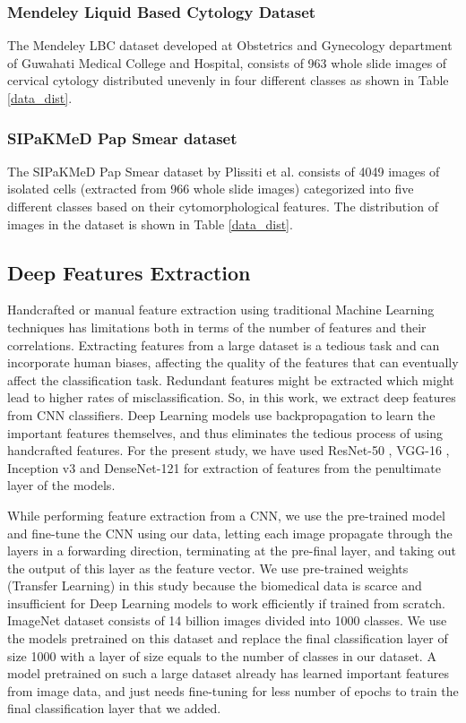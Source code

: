 \documentclass{llncs}
\begin{document}
\subsubsection{Mendeley Liquid Based Cytology Dataset}
The Mendeley LBC dataset \cite{hussain2020liquid} developed at Obstetrics and Gynecology department of Guwahati Medical College and Hospital, consists of 963 whole slide images of cervical cytology distributed unevenly in four different classes as shown in Table \ref{data_dist}.
\subsubsection{SIPaKMeD Pap Smear dataset}
The SIPaKMeD Pap Smear dataset by Plissiti et al. \cite{plissiti2018sipakmed} consists of 4049 images of isolated cells (extracted from 966 whole slide images) categorized into five different classes based on their cytomorphological features. The distribution of images in the dataset is shown in Table \ref{data_dist}.
\subsection{Deep Features Extraction}
Handcrafted or manual feature extraction using traditional Machine Learning techniques has limitations both in terms of the number of features and their correlations. Extracting features from a large dataset is a tedious task and can incorporate human biases, affecting the quality of the features that can eventually affect the classification task. Redundant features might be extracted which might lead to higher rates of misclassification. So, in this work, we extract deep features from CNN classifiers. Deep Learning models use backpropagation to learn the important features themselves, and thus eliminates the tedious process of using handcrafted features. For the present study, we have used ResNet-50 \cite{he2016deep}, VGG-16 \cite{simonyan2014very}, Inception v3 \cite{szegedy2016rethinking} and DenseNet-121 \cite{huang2017densely} for extraction of features from the penultimate layer of the models.

While performing feature extraction from a CNN, we use the pre-trained model and fine-tune the CNN using our data, letting each image propagate through the layers in a forwarding direction, terminating at the pre-final layer, and taking out the output of this layer as the feature vector. We use pre-trained weights (Transfer Learning) in this study because the biomedical data is scarce and insufficient for Deep Learning models to work efficiently if trained from scratch. ImageNet \cite{deng2009imagenet} dataset consists of 14 billion images divided into 1000 classes. We use the models pretrained on this dataset and replace the final classification layer of size 1000 with a layer of size equals to the number of classes in our dataset. A model pretrained on such a large dataset already has learned important features from image data, and just needs fine-tuning for less number of epochs to train the final classification layer that we added.
\end{document}
